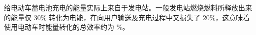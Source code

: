 \documentclass[\gkver]{gaokaozhenti}
\begin{document}
\begin{enumerate}
给电动车蓄电池充电的能量实际上来自于发电站。一般发电站燃烧燃料所释放出来的能量仅 $30\%$ 转化为电能，在向用户输送及充电过程中又损失了 $20\%$，这意味着使用电动车时能量转化的总效率约为 $\%$。




\end{enumerate}
\end{document}
